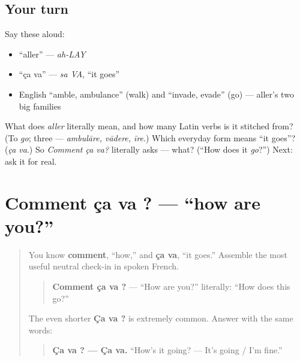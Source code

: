 \subsection*{Your turn}
Say these aloud:

\begin{itemize}
\raggedright
  \item \textquotedblleft{}aller\textquotedblright{} — \emph{ah-LAY}
  \item \textquotedblleft{}ça va\textquotedblright{} — \emph{sa VA}, \textquotedblleft{}it goes\textquotedblright{}
  \item English \textquotedblleft{}amble, ambulance\textquotedblright{} (walk) and \textquotedblleft{}invade, evade\textquotedblright{} (go) — aller's two big families
\end{itemize}

\begin{tcolorbox}[breakable,colback=teal!4,colframe=teal!35!black,title={Before you move on}]
What does \emph{aller} literally mean, and how many Latin verbs is it stitched from? (To \emph{go}; three — \emph{ambulāre, vādere, īre}.) Which everyday form means \textquotedblleft{}it goes\textquotedblright{}? (\emph{ça va}.) So \emph{Comment ça va?} literally asks — what? (\textquotedblleft{}How does it \emph{go}?\textquotedblright{}) Next: ask it for real.
\end{tcolorbox}
\section[comment ça va ?]{Comment ça va ? — “how are you?”}

\label{lesson:FR-C03-comment-ca-va}



\begin{quote}
You know \textbf{comment}, “how,” and \textbf{ça va}, “it goes.” Assemble the most useful neutral check-in in spoken French.

\begin{quote}
\textbf{Comment ça va ?} — “How are you?” literally: “How does this go?”
\end{quote}

The even shorter \textbf{Ça va ?} is extremely common. Answer with the same words:

\begin{quote}
\textbf{Ça va ? — Ça va.} “How’s it going? — It’s going / I’m fine.”
\end{quote}
\end{quote}

